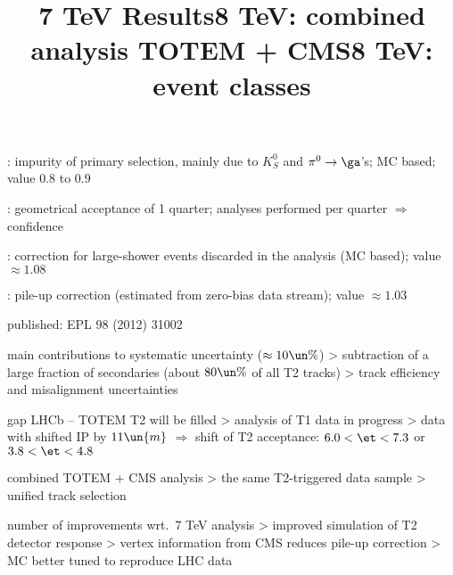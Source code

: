 \> : impurity of primary selection, mainly due to $K_S^0$ and $\pi^0\rightarrow \ga$'s; MC based; value $0.8$ to $0.9$

\> \Em{$2\pi/\Ph$}: geometrical acceptance of 1 quarter; analyses performed per quarter $\Rightarrow$ confidence

\> : correction for large-shower events discarded in the analysis (MC based); value $\approx 1.08$

\> : pile-up correction (estimated from zero-bias data stream); value $\approx 1.03$

\newpage %
\title{7 TeV Results}

\> published: EPL 98 (2012) 31002

\> main contributions to systematic uncertainty ($\approx 10\un{\%}$)
\>> subtraction of a large fraction of secondaries (about $80\un{\%}$ of all T2 tracks)
\>> track efficiency and misalignment uncertainties



\> gap LHCb -- TOTEM T2 will be filled
\>> analysis of T1 data in progress
\>> data with shifted IP by $11\un{m}$ $\Rightarrow$ shift of T2 acceptance: $6.0 < \et < 7.3$ or  $3.8 < \et < 4.8$


\newpage %
\title{8 TeV: combined analysis TOTEM + CMS}

\vskip-3mm

\> combined TOTEM + CMS analysis
\>> the same T2-triggered data sample
\>> unified track selection

\> number of improvements wrt.~7 TeV analysis
\>> improved simulation of T2 detector response
\>> vertex information from CMS reduces pile-up correction
\>> MC better tuned to reproduce LHC data

\vfil
{}

\newpage %
\title{8 TeV: event classes}

